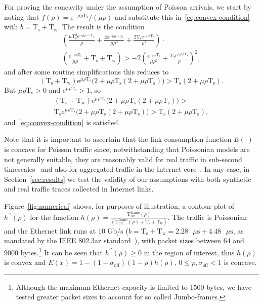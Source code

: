 \documentclass[journal,english,twocolumn,10pt,letterpaper]{IEEEtran}
\newcommand{\added}[1]{{#1}}
\newcommand{\addedfragile}[1]{{#1}}
\newcommand{\Constantconstant}[2]{\mathrm{#1}_{\mathrm{#2}}}
\newcommand{\Ts}{\Constantconstant T s}
\newcommand{\Tw}{\Constantconstant T w}
\newcommand{\Toff}{\mathrm{T}_{\mathrm{off}}}
\begin{document}
For proving the concavity under the assumption of Poisson arrivals, we start
by noting that $f(\rho) = \textrm{e}^{-\mu\rho \Ts}/ (\mu\rho)$ and substitute
this in~\eqref{eq:convex-condition} with $b = \Ts + \Tw$. The result is the
condition
\begin{equation}
  \begin{split}
    \left( \frac{\mu \Ts^2 \textrm{e}^{-\mu\rho - \Ts}}{\rho} +
      \frac{2 \textrm{e}^{-\mu\rho - \Ts}}{\mu\rho^3} + \frac{2
        \Ts \textrm{e}^{-\mu\rho \Ts}}{\rho^2} \right) \cdot \\
    \left( \frac{\textrm{e}^{-\mu\rho \Ts}}{\mu\rho} + \Ts + \Tw
    \right) > -2 \left( \frac{\textrm{e}^{-\mu\rho \Ts}}{\mu\rho^2} +
      \frac{\Ts \mathrm{e}^{-\mu\rho \Ts}}{\rho} \right)^2,
  \end{split}
\end{equation}
and after some routine simplifications this reduces to
\begin{equation}
  (\Ts + \Tw)
  \mathrm{e}^{\mu\rho \Ts} \bigl(2 + \mu \rho \Ts (2 + \mu\rho
  \Ts) \bigr) > \Ts (2 + \mu\rho \Ts).
\end{equation}
But $\mu\rho \Ts > 0$ and $\mathrm{e}^{\mu\rho \Ts} > 1$, so
\begin{equation}
  \begin{split}
    (\Ts + \Tw) \mathrm{e}^{\mu\rho \Ts} \bigl(2 + \mu \rho
    \Ts (2 + \mu\rho \Ts) \bigr) > \\
    \Ts \mathrm{e}^{\mu\rho\Ts} \bigl(2 + \mu \rho \Ts (2 + \mu\rho \Ts)
    \bigr) > \Ts (2 + \mu\rho \Ts),
  \end{split}
\end{equation}
and~\eqref{eq:convex-condition} is satisfied.

Note that it is important to ascertain that the link consumption function
$E(\cdot)$ is concave for Poisson traffic since, notwithstanding that
Poissonian models are not generally suitable, they are reasonably valid for
real traffic in sub-second timescales~\cite{Karagiannis04} and also for
aggregated traffic in the Internet core~\cite{Vishwanath09}. In any case, in
Section~\ref{sec:results} we test the validity of our assumptions with both
synthetic and real traffic traces collected in Internet links.

Figure~\ref{fig:numerical} shows, for purposes of illustration, a contour plot
of $h^{\prime\prime}(\rho)$ for the function
$h(\rho) = \frac{\Toff^{\text{frame}}(\rho)}{(\Toff^{\text{frame}}(\rho) + \Ts
  + \Tw)}$.
The traffic is Poissonian and the Ethernet link runs at $10$ Gb/s
($b = \Ts + \Tw = 2.28\text{ $\mu$s} + 4.48\text{ $\mu$s}$, as mandated by the
IEEE 802.3az standard~\cite{802.3az}), with packet sizes between $64$ and
$9000$ bytes.\added{\footnote{\addedfragile{Although the maximum Ethernet
      capacity is limited to 1500 bytes, we have tested greater packet sizes
      to account for so called Jumbo-frames.}}} It can be seen that
$h^{\prime\prime}(\rho) \ge 0$ in the region of interest, thus $h(\rho)$ is
convex and
$E(x) = 1 - (1-\sigma_{\mathrm{off}})(1-\rho)h(\rho),\, 0 \le \rho,
\sigma_{\mathrm{off}} < 1$ is concave.
\end{document}
